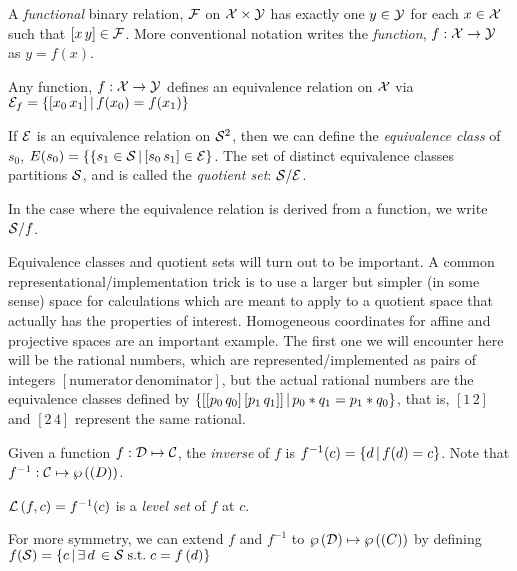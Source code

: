 
A \textit{functional} binary relation, $\mathcal{F}$ on $\mathcal{X}
\times \mathcal{Y}$ has exactly one $y \in \mathcal{Y}$ for each
$x \in \mathcal{X}$ such that $[x \, y] \in \mathcal{F}$.
More conventional notation writes the \textit{function}, 
$f : \mathcal{X} \rightarrow \mathcal{Y}$ as $y = f(x)$.

Any function, $f : \mathcal{X} \rightarrow \mathcal{Y}$ defines an
equivalence relation on $\mathcal{X}$ via 
$\mathcal{E}_f =  \left\{ [x_0 \, x_1] \, | \, f(x_0) = f(x_1) \right\} $


If $\mathcal{E}$ is an equivalence relation on $\mathcal{S}^2$, then we
can define the \textit{equivalence class} of $s_0$, $E(s_0) = \{
 \left\{ s_1 \in \mathcal{S} \, | \, [s_0 \, s_1] \in \mathcal{E}  \right\} $.
The set of distinct equivalence classes partitions $\mathcal{S}$,
and is called the \textit{quotient set}: $\mathcal{S} / \mathcal{E}$.

In the case where the equivalence relation is derived from a
function, we write $\mathcal{S} / f$.

Equivalence classes and quotient sets will turn out to be
important. A common representational/implementation trick is to
use a larger but simpler (in some sense) space for calculations
which are meant to apply to a quotient space that actually has the
properties of interest. Homogeneous coordinates for affine and
projective spaces  are an important example.
The first one we will encounter here will be the rational numbers,
which are represented/implemented as pairs of integers
$[\text{numerator} \, \text{denominator}]$, but the actual
rational numbers are the equivalence classes defined by 
$ \left\{  [[p_0 \, q_0] \, [p_1 \, q_1]] \, | \, p_0*q_1 = p_1*q_0  \right\} $,
that is, $[1 \, 2]$ and $[2 \, 4]$ represent the same rational.

\label{sec:Inverses-and-pseudo-inverses}

Given a function $f : \mathcal{D} \mapsto \mathcal{C}$,
the \textit{inverse} of $f$ is 
$f^{-1}(c) =  \left\{ d \, | \, f(d) = c \right\} $.
Note that $f^{-1} : \mathcal{C}  \mapsto  \wp \left( \mathcal{(}D) \right) $.

$\mathcal{L}\left( f , c \right) = f^{-1}(c)$ is a \textit{level set} of
$f$ at $c$.

For more symmetry, we can extend $f$ and $f^{-1}$ to 
$ \wp \left( \mathcal{D} \right)   \mapsto  \wp \left( \mathcal{(}C) \right) $
by defining
$f(\mathcal{S}) = 
 \left\{ c \, | \, \exists \, d \, \in \mathcal{S} \; \text{s.t.} \; c = f \left( d \right) \right\} $

